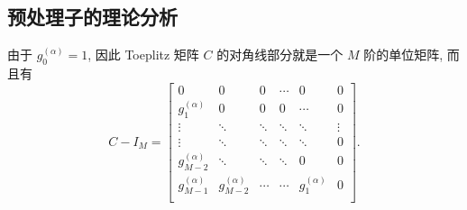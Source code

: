\documentclass{ecnumaster}
\begin{document}
\subsection{预处理子的理论分析}
由于 $g_0^{(\alpha)}=1$, 因此 Toeplitz 矩阵 $C$
的对角线部分就是一个 $M$ 阶的单位矩阵, 而且有
%
$$
  C - I_M = \left[ \begin{matrix} 0 & 0 & 0 & \cdots & 0 & 0 \\
g_1^{(\alpha)} & 0 & 0 & 0 & \cdots &  0 \\
\vdots & \ddots & \ddots & \ddots & \ddots & \vdots\\
\vdots & \ddots & \ddots & \ddots & \ddots & 0\\
g_{M-2}^{(\alpha)}& \ddots & \ddots & \ddots & 0 & 0\\
g_{M-1}^{(\alpha)}& g_{M-2}^{(\alpha)} & \cdots & \cdots & g_1^{(\alpha)} & 0\\
\end{matrix} \right].
$$
\end{document}
